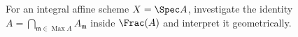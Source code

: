 \begin{problem}\label{chal:vi27-02}
For an integral affine scheme $X=\Spec A$, investigate the identity $A=\bigcap_{\mathfrak m\in\operatorname{Max}A}A_{\mathfrak m}$ inside $\Frac(A)$ and interpret it geometrically.
\end{problem}
